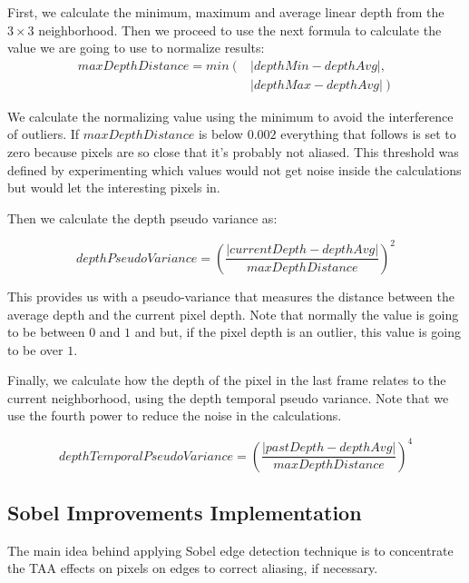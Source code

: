 \documentclass{cslthse-msc}
\begin{document}
First, we calculate the minimum, maximum and average linear depth from the $3\times 3$ neighborhood. Then we proceed to use the next formula to calculate the value we are going to use to normalize results:
\begin{equation} \label{eq:maxdepthdistance}
\begin{split} 
	maxDepthDistance = min \left( \right. & \left| depthMin-depthAvg \right|  ,   \\ 
	 &  \left.\left| depthMax-depthAvg\right| \right) 
\end{split} 
\end{equation}

We calculate the normalizing value using the minimum to avoid the interference of outliers. If $maxDepthDistance$  is below $0.002$ everything that follows is set to zero because pixels are so close that it’s probably not aliased. This threshold was defined by experimenting which values would not get noise inside the calculations but would let the interesting pixels in. 

Then we calculate the depth pseudo variance as:

\begin{equation} \label{eq:depthpseudovariance}
	depthPseudoVariance = \left( \frac{\left|currentDepth-depthAvg\right|}{maxDepthDistance}\right)^2
\end{equation}

This provides us with a pseudo-variance that measures the distance between the average depth and the current pixel depth. Note that normally the value is going to be between $0$ and $1$ and but, if the pixel depth is an outlier, this value is going to be over $1$.

Finally, we calculate how the depth of the pixel in the last frame relates to the current neighborhood, using the depth temporal pseudo variance. Note that we use the fourth power to reduce the noise in the calculations.

\begin{equation} \label{eq:depthtemporalpseudovariance}
depthTemporalPseudoVariance = \left( \frac{\left|pastDepth-depthAvg\right|}{maxDepthDistance}\right)^4
\end{equation}

\subsection{Sobel Improvements Implementation}
The main idea behind applying Sobel edge detection technique is to concentrate the TAA effects on pixels on edges to correct aliasing, if necessary.  
\end{document}
